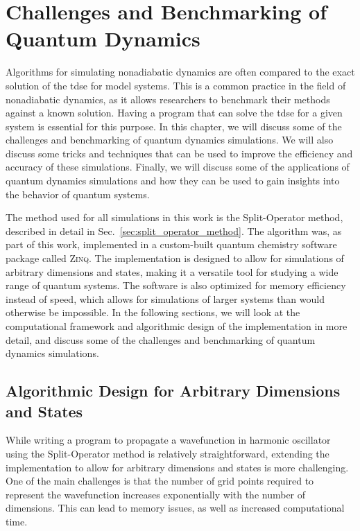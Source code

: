 \section{Challenges and Benchmarking of Quantum Dynamics}
Algorithms for simulating nonadiabatic dynamics are often compared to the exact solution of the \gls{tdse} for model systems. This is a common practice in the field of nonadiabatic dynamics, as it allows researchers to benchmark their methods against a known solution. Having a program that can solve the \gls{tdse} for a given system is essential for this purpose. In this chapter, we will discuss some of the challenges and benchmarking of quantum dynamics simulations. We will also discuss some tricks and techniques that can be used to improve the efficiency and accuracy of these simulations. Finally, we will discuss some of the applications of quantum dynamics simulations and how they can be used to gain insights into the behavior of quantum systems.

The method used for all simulations in this work is the Split-Operator method, described in detail in Sec.~\ref{sec:split_operator_method}. The algorithm was, as part of this work, implemented in a custom-built quantum chemistry software package called \textsc{Zinq}.\supercite{10.5281/zenodo.18386143} The implementation is designed to allow for simulations of arbitrary dimensions and states, making it a versatile tool for studying a wide range of quantum systems. The software is also optimized for memory efficiency instead of speed, which allows for simulations of larger systems than would otherwise be impossible. In the following sections, we will look at the computational framework and algorithmic design of the implementation in more detail, and discuss some of the challenges and benchmarking of quantum dynamics simulations.

\subsection{Algorithmic Design for Arbitrary Dimensions and States}
While writing a program to propagate a wavefunction in harmonic oscillator using the Split-Operator method is relatively straightforward, extending the implementation to allow for arbitrary dimensions and states is more challenging. One of the main challenges is that the number of grid points required to represent the wavefunction increases exponentially with the number of dimensions. This can lead to memory issues, as well as increased computational time.


